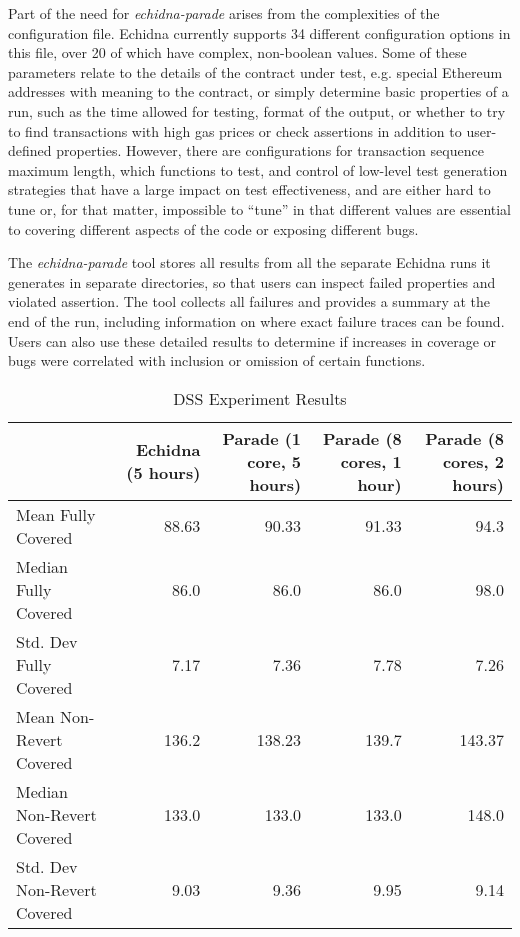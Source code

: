 \documentclass[sigconf]{acmart}
\begin{document}
{Part of the need for \emph{echidna-parade} arises from the
complexities of the configuration file.  Echidna currently supports 34
different configuration options in this file, over 20 of which have
complex, non-boolean values.  Some of these parameters relate to the
details of the contract under test, e.g. special Ethereum addresses
with meaning to the contract, or simply determine basic properties of
a run, such as the time allowed for testing, format of the output, or
whether to try to find transactions with high gas prices or check
assertions in addition to user-defined properties.  However, there are
configurations for transaction sequence maximum length, which
functions to test, and control of low-level test generation strategies
that have a large impact on test effectiveness, and are either hard to
tune or, for that matter, impossible to ``tune'' in that different
values are essential to covering different aspects of the code or
exposing different bugs.

The \emph{echidna-parade} tool stores all results from all the separate Echidna runs it generates in separate directories, so that users can inspect failed properties and violated assertion.  The tool collects all failures and provides a summary at the end of the run, including information on where exact failure traces can be found.  Users can also use these detailed results to determine if increases in coverage or bugs were correlated with inclusion or omission of certain functions.

\begin{table*}
\centering
\begin{tabular}{l|r|r|r|r}
& Echidna (5 hours) & Parade (1 core, 5 hours) & Parade (8 cores, 1
                                                 hour) & Parade (8
                                                         cores, 2
                                                         hours) \\
  \hline
  Mean Fully Covered & 88.63 & 90.33 & 91.33 & 94.3 \\
  Median Fully Covered & 86.0 & 86.0 & 86.0 & 98.0 \\
  Std. Dev Fully Covered & 7.17 & 7.36 & 7.78 & 7.26 \\
  \hline
  Mean Non-Revert Covered & 136.2 & 138.23 & 139.7 & 143.37 \\
  Median Non-Revert Covered & 133.0 & 133.0 & 133.0 & 148.0 \\
  Std. Dev Non-Revert Covered & 9.03 & 9.36 & 9.95 & 9.14 \\                         
\end{tabular}
\caption{DSS Experiment Results}
\label{tab:exp}
\end{table*}


}
\end{document}
